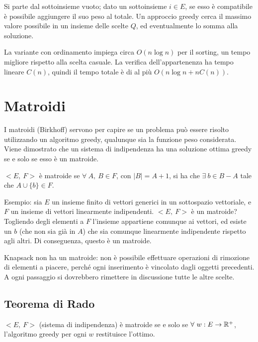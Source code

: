 Si parte dal sottoinsieme vuoto; dato un sottoinsieme $i \in E$, se esso è compatibile è possibile aggiungere il suo peso al totale. Un approccio greedy cerca il massimo valore possibile in un insieme delle scelte $Q$, ed eventualmente lo somma alla soluzione. 

La variante con ordinamento impiega circa $O(n \log n)$ per il sorting, un tempo migliore rispetto alla scelta casuale. La verifica dell'appartenenza ha tempo lineare $C(n)$, quindi il tempo totale è di al più $O(n \log n + nC(n))$.

\newpage
\section{Matroidi}
I matroidi (Birkhoff) servono per capire se un problema può essere risolto utilizzando un algoritmo greedy, qualunque sia la funzione peso considerata. Viene dimostrato che un sistema di indipendenza ha una soluzione ottima greedy se e solo se esso è un matroide.

$<E,\ F>$ è matroide se $\forall\ A,\ B \in F$, con $|B| = A + 1$, si ha che $\exists\ b \in B - A$ tale che $A \cup \{b\} \in F$.

Esempio: sia $E$ un insieme finito di vettori generici in un sottospazio vettoriale, e $F$ un insieme di vettori linearmente indipendenti. $<E,\ F>$ è un matroide? \\
Togliendo degli elementi a $F$ l'insieme appartiene comunque ai vettori, ed esiste un $b$ (che non sia già in $A$)  che sia comunque linearmente indipendente rispetto agli altri. Di conseguenza, questo è un matroide. 

Knapsack non ha un matroide: non è possibile effettuare operazioni di rimozione di elementi a piacere, perché ogni inserimento è vincolato dagli oggetti precedenti. A ogni passaggio si dovrebbero rimettere in discussione tutte le altre scelte. 

\subsection{Teorema di Rado}
$<E,\ F>$ (sistema di indipendenza) è matroide se e solo se $\forall\ w : E \rightarrow \mathbb{R}^+$, l'algoritmo greedy per ogni $w$ restituisce l'ottimo.

